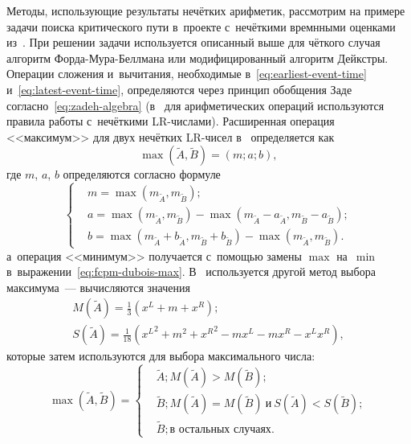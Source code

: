 Методы, использующие результаты нечётких арифметик, рассмотрим на примере задачи поиска критического пути в~проекте с~нечёткими времнными оценками из~\cite{Dubois_Prade}. При решении задачи используется описанный выше для чёткого случая алгоритм Форда-Мура-Беллмана или модифицированный алгоритм Дейкстры. Операции сложения и~вычитания, необходимые в~\eqref{eq:earliest-event-time} и~\eqref{eq:latest-event-time}, определяются через принцип обобщения Заде согласно~\eqref{eq:zadeh-algebra} (в~\cite{Iran_Railways, Uskov_FCPM, Leondes} для арифметических операций используются правила работы с~нечёткими LR-числами). Расширенная операция <<максимум>> для двух нечётких LR-чисел в~\cite{Dubois_Prade, Uskov_FCPM} определяется как
\begin{equation*}
  \max \left(\tilde A, \tilde B \right) = \left(m; a; b \right),
\end{equation*}
где $m$, $a$, $b$ определяются согласно формуле
\begin{equation}
  \label{eq:fcpm-dubois-max}
  \left \{ \begin{aligned}
    & m = \max \left( m_{\tilde A}, m_{\tilde B} \right); \\
    & a = \max \left( m_{\tilde A}, m_{\tilde B} \right) - \max \left( m_{\tilde A} - a_{\tilde A}, m_{\tilde B} - a_{\tilde B} \right); \\
    & b = \max \left( m_{\tilde A} + b_{\tilde A}, m_{\tilde B} + b_{\tilde B} \right) - \max \left( m_{\tilde A}, m_{\tilde B} \right).
  \end{aligned} \right.
\end{equation}
а~операция <<минимум>> получается с~помощью замены $\max$ на~$\min$ в~выражении~\eqref{eq:fcpm-dubois-max}. В~\cite{Leondes} используется другой метод выбора максимума~--- вычисляются значения
\begin{gather*}
  M\left(\tilde A \right) = \frac{1}{3}\left(x^L+m+x^R\right); \\
  S\left(\tilde A \right) = \frac{1}{18}\left( {x^L}^2+m^2+{x^R}^2 - mx^L - mx^R -x^L x^R \right),
\end{gather*}
которые затем используются для выбора максимального числа:
\begin{equation}
\label{eq:mccaloh-lee-comparison}
  \max \left(\tilde A, \tilde B \right) =
  \left\{ \begin{aligned}
    & \tilde A; M\left(\tilde A \right) > M\left(\tilde B \right); \\
    & \tilde B; M\left(\tilde A \right) = M\left(\tilde B \right)\ \text{и}\ S\left(\tilde A \right) < S\left(\tilde B \right); \\
    & \tilde B; \text{в остальных случаях}.
  \end{aligned}\right.
\end{equation}

